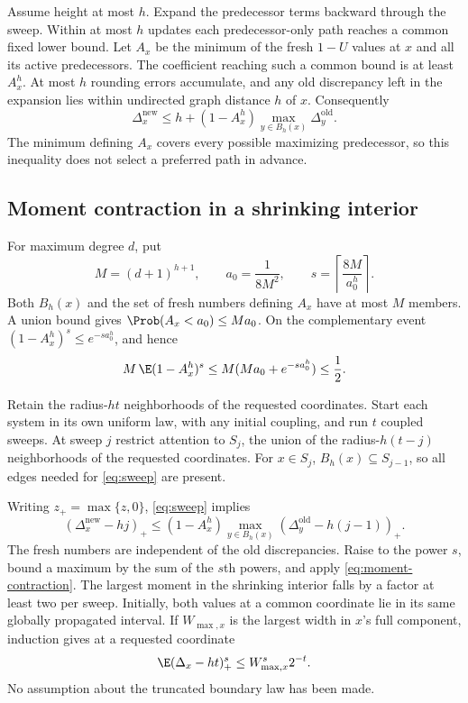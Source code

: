 Assume height at most $h$. Expand the predecessor terms backward through
the sweep. Within at most $h$ updates each predecessor-only path reaches
a common fixed lower bound. Let $A_x$ be the minimum of the fresh
$1-U$ values at $x$ and all its active predecessors.
The coefficient reaching such a common bound is at least $A_x^h$.
At most $h$ rounding errors accumulate, and any old discrepancy left in
the expansion lies within undirected graph distance $h$ of $x$.
Consequently
\begin{equation}
 \Delta_x^{\mathrm{new}}\leq
 h+(1-A_x^h)\max_{y\in B_h(x)}\Delta_y^{\mathrm{old}}.
\label{eq:sweep}
\end{equation}
The minimum defining $A_x$ covers every possible maximizing predecessor,
so this inequality does not select a preferred path in advance.

\subsection{Moment contraction in a shrinking interior}

For maximum degree $d$, put
\begin{equation}
 M=(d+1)^{h+1},\qquad a_0=\frac1{8M^2},\qquad
 s=\left\lceil\frac{8M}{a_0^h}\right\rceil .
\label{eq:moment-constants}
\end{equation}
Both $B_h(x)$ and the set of fresh numbers defining $A_x$ have at most $M$
members. A union bound gives $\Prob(A_x<a_0)\leq Ma_0$.
On the complementary event $(1-A_x^h)^s\leq e^{-sa_0^h}$, and hence
\begin{equation}
            M\,\E(1-A_x^h)^s
            \leq M(Ma_0+e^{-sa_0^h})\leq\frac12.
\label{eq:moment-contraction}
\end{equation}

Retain the radius-$ht$ neighborhoods of the requested coordinates.
Start each system in its own uniform law, with any initial coupling, and
run $t$ coupled sweeps. At sweep $j$ restrict attention to
$S_j$, the union of the radius-$h(t-j)$ neighborhoods of the requested
coordinates. For $x\in S_j$, $B_h(x)\subseteq S_{j-1}$, so all edges
needed for \eqref{eq:sweep} are present.

Writing $z_+=\max\{z,0\}$, \eqref{eq:sweep} implies
\[
 (\Delta_x^{\mathrm{new}}-hj)_+
 \leq(1-A_x^h)
       \max_{y\in B_h(x)}(\Delta_y^{\mathrm{old}}-h(j-1))_+.
\]
The fresh numbers are independent of the old discrepancies.
Raise to the power $s$, bound a maximum by the sum of the $s$th powers,
and apply \eqref{eq:moment-contraction}. The largest moment in the
shrinking interior falls by a factor at least two per sweep.
Initially, both values at a common coordinate lie in its same globally
propagated interval. If $W_{\max,x}$ is the largest width in $x$'s full
component, induction gives at a requested coordinate
\begin{equation}
                \E(\Delta_x-ht)_+^s\leq W_{\max,x}^s2^{-t}.
\label{eq:moment-final}
\end{equation}
No assumption about the truncated boundary law has been made.

